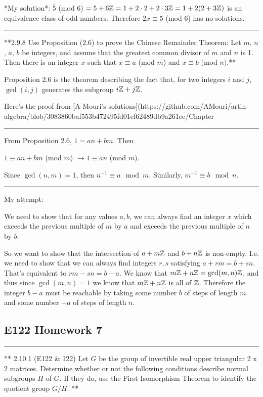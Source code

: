 *My solution*: $\bar 5$ (mod 6) $= 5 + 6\mathbb{Z} = 1 + 2\cdot2 + 2\cdot3\mathbb{Z} = 1 + 2(2 + 3\mathbb{Z})$ is an
equivalence class of odd numbers. Therefore $2x \equiv 5$ (mod 6) has no
solutions.



\hrule

**2.9.8 Use Proposition (2.6) to prove the Chinese Remainder Theorem: Let $m$,
$n$, $a$, $b$ be integers, and assume that the greatest common divisor of $m$
and $n$ is 1. Then there is an integer $x$ such that $x \equiv a$ (mod $m$)
and $x \equiv b$ (mod $n)$.**

Proposition 2.6 is the theorem describing the fact that, for two integers $i$
and $j$, $\gcd(i, j)$ generates the subgroup $i\mathbb{Z} + j\mathbb{Z}$.

Here's the proof from [A Mouri's solutions](https://github.com/AMouri/artin-algebra/blob/3083860baf553b472495fd01ef62489db9a261ee/Chapter%

\hrule

From Proposition 2.6, $1 = an + bm$. Then

$1 \equiv an + bm$ (mod $m$) $\rightarrow 1 \equiv an$ (mod $m$).

Since $\gcd(n, m) = 1$, then $n^{-1} \equiv a \mod m$. Similarly, $m^{-1}
\equiv b \mod n$.

\hrule
My attempt:

We need to show that for any values $a,b$, we can always find an integer $x$
which exceeds the previous multiple of $m$ by $a$ and exceeds the previous
multiple of $n$ by $b$.

So we want to show that the intersection of $a + m\mathbb{Z}$ and $b + n\mathbb{Z}$ is
non-empty. I.e. we need to show that we can always find integers $r, s$
satisfying $a + rm = b +sn$. That's equivalent to $rm - sn = b - a$. We know
that $m\mathbb{Z} + n\mathbb{Z} = \gcd(m, n)\mathbb{Z}$, and thus since $\gcd(m, n) = 1$ we know that
$m\mathbb{Z} + n\mathbb{Z}$ is all of $\mathbb{Z}$. Therefore the integer $b - a$ must be reachable by
taking some number $b$ of steps of length $m$ and some number $-a$ of steps of
length $n$.

\subsection{E122 Homework 7}

\hrule


** 2.10.1 (E122 \& 122) Let $G$ be the group of invertible real upper triangular
2 x 2 matrices. Determine whether or not the following conditions describe
normal subgroups $H$ of $G$. If they do, use the First Isomorphism Theorem to
identify the quotient group $G/H$. **

